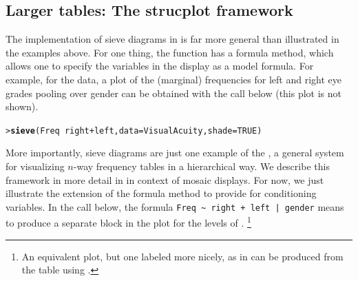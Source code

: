 \documentclass[10pt,krantz2]{krantz}\usepackage[]{graphicx}\usepackage[]{color}
\makeatletter
\newcommand{\hlnum}[1]{\textcolor[rgb]{0.686,0.059,0.569}{#1}}%
\newcommand{\hlopt}[1]{\textcolor[rgb]{0,0,0}{#1}}%
\newcommand{\hlstd}[1]{\textcolor[rgb]{0.345,0.345,0.345}{#1}}%
\newcommand{\hlkwc}[1]{\textcolor[rgb]{0.333,0.667,0.333}{#1}}%
\newcommand{\hlkwd}[1]{\textcolor[rgb]{0.737,0.353,0.396}{\textbf{#1}}}%
\newenvironment{kframe}{%
 \def\at@end@of@kframe{}%
 \ifinner\ifhmode%
  \def\at@end@of@kframe{\end{minipage}}%
  \begin{minipage}{\columnwidth}%
 \fi\fi%
 \def\FrameCommand##1{\hskip\@totalleftmargin \hskip-\fboxsep
 \colorbox{shadecolor}{##1}\hskip-\fboxsep
     \hskip-\linewidth \hskip-\@totalleftmargin \hskip\columnwidth}%
 \MakeFramed {\advance\hsize-\width
   \@totalleftmargin\z@ \linewidth\hsize
   \@setminipage}}%
 {\par\unskip\endMakeFramed%
 \at@end@of@kframe}
\newenvironment{knitrout}{}{} %
\renewenvironment{knitrout}{\small\renewcommand{\baselinestretch}{.85}}{} %
\makeatother
\begin{document}
\subsection{Larger tables: The strucplot framework}\label{sec:twoway-sieve-larger}
The implementation of sieve diagrams in  is far more
general than illustrated in the examples above.  For one thing,
the  function has a formula method, which allows one to specify
the variables in the display as a model formula.
For example, for the  data, a plot of
the (marginal) frequencies for left and right eye grades
pooling over gender can be obtained with the call below
(this plot is not shown).

\begin{knitrout}
\color{fgcolor}\begin{kframe}
\begin{alltt}
\hlstd{> }\hlkwd{sieve}\hlstd{(Freq} \hlopt{~} \hlstd{right} \hlopt{+} \hlstd{left,}  \hlkwc{data} \hlstd{= VisualAcuity,} \hlkwc{shade}\hlstd{=}\hlnum{TRUE}\hlstd{)}
\end{alltt}
\end{kframe}
\end{knitrout}

More importantly, sieve diagrams are just one example of
the , a general system for
visualizing $n$-way frequency tables in a hierarchical
way.  We describe this framework in more detail in
 in context of mosaic
displays.  For now, we just illustrate the extension of
the formula method to provide for conditioning variables.
In the call below, the formula \verb#Freq ~ right + left | gender#
means to produce a separate block in the plot for the levels of
.%
\footnote{
An equivalent plot, but one labeled more nicely, as in 
can be produced from the  table using
.
}
\end{document}
